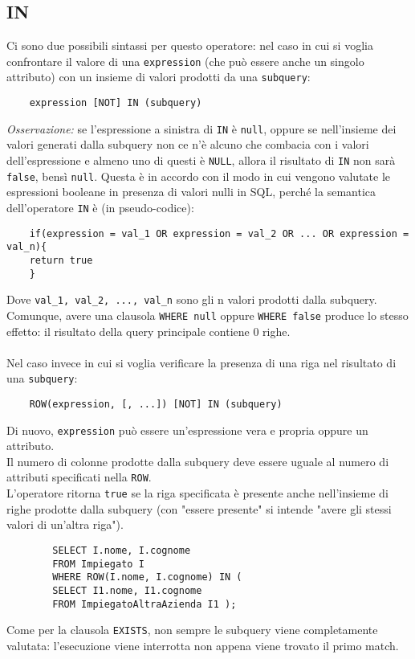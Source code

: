 \documentclass[12pt,a4paper]{book}
\begin{document}
	\subsection{IN}
	Ci sono due possibili sintassi per questo operatore: nel caso in cui si voglia confrontare il valore di una \texttt{expression} (che può essere anche un singolo attributo) con un insieme di valori prodotti da una \texttt{subquery}:
	\begin{lstlisting}
	expression [NOT] IN (subquery)
	\end{lstlisting}
	\textit{Osservazione:} se l'espressione a sinistra di \texttt{IN} è \texttt{null}, oppure se nell'insieme dei valori generati dalla subquery non ce n'è alcuno che combacia con i valori dell'espressione e almeno uno di questi è \texttt{NULL}, allora il risultato di \texttt{IN} non sarà \texttt{false}, bensì \texttt{null}. Questa è in accordo con il modo in cui vengono valutate le espressioni booleane in presenza di valori nulli in SQL, perché la semantica dell'operatore \texttt{IN} è (in pseudo-codice): 
	\begin{lstlisting}
	if(expression = val_1 OR expression = val_2 OR ... OR expression = val_n){
	return true
	}
	\end{lstlisting}
	Dove \texttt{val_1, val_2, ..., val_n} sono gli n valori prodotti dalla subquery.\\
	Comunque, avere una clausola \texttt{WHERE null} oppure \texttt{WHERE false} produce lo stesso effetto: il risultato della query principale contiene 0 righe.
	\paragraph{}Nel caso invece in cui si voglia verificare la presenza di una riga nel risultato di una \texttt{subquery}:
	\begin{lstlisting}
	ROW(expression, [, ...]) [NOT] IN (subquery)
	\end{lstlisting}
	Di nuovo, \texttt{expression} può essere un'espressione vera e propria oppure un attributo.\\
	Il numero di colonne prodotte dalla subquery deve essere uguale al numero di attributi specificati nella \texttt{ROW}.\\
	L'operatore ritorna \texttt{true} se la riga specificata è presente anche nell'insieme di righe prodotte dalla subquery (con "essere presente" si intende "avere gli stessi valori di un'altra riga").\\
	\begin{tcolorbox}[enhanced jigsaw, breakable,title=Esempio, title filled]
		\begin{lstlisting}
		SELECT I.nome, I.cognome
		FROM Impiegato I
		WHERE ROW(I.nome, I.cognome) IN (
		SELECT I1.nome, I1.cognome 
		FROM ImpiegatoAltraAzienda I1 );
		\end{lstlisting}
	\end{tcolorbox}
	Come per la clausola \texttt{EXISTS}, non sempre le subquery viene completamente valutata: l'esecuzione viene interrotta non appena viene trovato il primo match.
\end{document}
